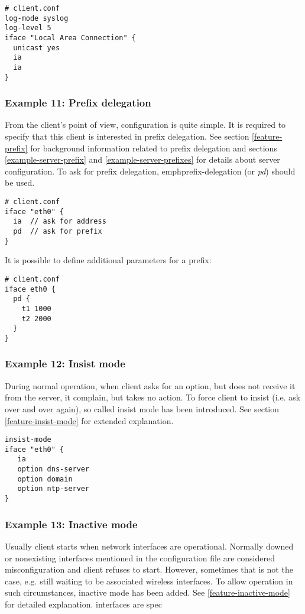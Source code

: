 \begin{lstlisting}
# client.conf
log-mode syslog
log-level 5
iface "Local Area Connection" {
  unicast yes
  ia
  ia
}
\end{lstlisting}

\subsubsection{Example 11: Prefix delegation}
\label{example-client-prefix}
From the client's point of view, configuration is quite simple. It is
required to specify that this client is interested in prefix
delegation. See section \ref{feature-prefix} for background
information related to prefix delegation and sections
\ref{example-server-prefix} and \ref{example-server-prefixes} for
details about server configuration. To ask for prefix delegation,
emph{prefix-delegation} (or \emph{pd}) should be used.

\begin{lstlisting}
# client.conf
iface "eth0" {
  ia  // ask for address
  pd  // ask for prefix
}
\end{lstlisting}

It is possible to define additional parameters for a prefix:

\begin{lstlisting}
# client.conf
iface eth0 {
  pd {
    t1 1000
    t2 2000
  }
}
\end{lstlisting}

\subsubsection{Example 12: Insist mode}
\label{example-client-insistmode}
During normal operation, when client asks for an option, but does not
receive it from the server, it complain, but takes no action. To force
client to insist (i.e. ask over and over again), so called insist mode
has been introduced. See section \ref{feature-insist-mode} for
extended explanation.

\begin{lstlisting}
insist-mode
iface "eth0" {
   ia
   option dns-server
   option domain
   option ntp-server
}
\end{lstlisting}

\subsubsection{Example 13: Inactive mode}
\label{example-client-inactivemode}
Usually client starts when network interfaces are
operational. Normally downed or nonexisting interfaces mentioned in
the configuration file are considered misconfiguration and client
refuses to start. However, sometimes that is not the case, e.g. still
waiting to be associated wireless interfaces. To allow operation in
such circumstances, inactive mode has been added. See
\ref{feature-inactive-mode} for detailed explanation.
interfaces are spec

